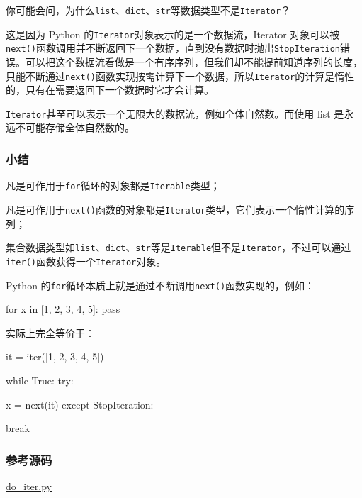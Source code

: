 你可能会问，为什么\texttt{list}、\texttt{dict}、\texttt{str}等数据类型不是\texttt{Iterator}？

这是因为 Python 的\texttt{Iterator}对象表示的是一个数据流，Iterator
对象可以被\texttt{next()}函数调用并不断返回下一个数据，直到没有数据时抛出\texttt{StopIteration}错误。可以把这个数据流看做是一个有序序列，但我们却不能提前知道序列的长度，只能不断通过\texttt{next()}函数实现按需计算下一个数据，所以\texttt{Iterator}的计算是惰性的，只有在需要返回下一个数据时它才会计算。

\texttt{Iterator}甚至可以表示一个无限大的数据流，例如全体自然数。而使用
list 是永远不可能存储全体自然数的。

\hypertarget{ux5c0fux7ed3}{%
\subsubsection{小结}\label{ux5c0fux7ed3}}

凡是可作用于\texttt{for}循环的对象都是\texttt{Iterable}类型；

凡是可作用于\texttt{next()}函数的对象都是\texttt{Iterator}类型，它们表示一个惰性计算的序列；

集合数据类型如\texttt{list}、\texttt{dict}、\texttt{str}等是\texttt{Iterable}但不是\texttt{Iterator}，不过可以通过\texttt{iter()}函数获得一个\texttt{Iterator}对象。

Python
的\texttt{for}循环本质上就是通过不断调用\texttt{next()}函数实现的，例如：

\begin{pythoncode}
for x in [1, 2, 3, 4, 5]:
    pass
\end{pythoncode}

实际上完全等价于：

\begin{pythoncode}
it = iter([1, 2, 3, 4, 5])

while True:
    try:
        
        x = next(it)
    except StopIteration:
        
        break
\end{pythoncode}

\hypertarget{ux53c2ux8003ux6e90ux7801}{%
\subsubsection{参考源码}\label{ux53c2ux8003ux6e90ux7801}}

\href{https://github.com/michaelliao/learn-python3/blob/master/samples/advance/do_iter.py}{do\_iter.py}

